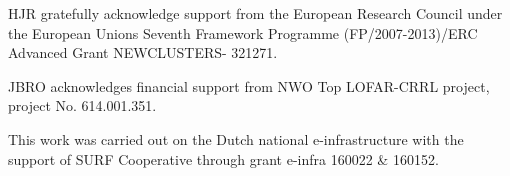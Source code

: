 HJR gratefully acknowledge support from the European Research Council under the European Unions Seventh Framework Programme (FP/2007-2013)/ERC Advanced Grant NEWCLUSTERS- 321271.

JBRO acknowledges financial support from NWO Top LOFAR-CRRL project, project No. 614.001.351. 


This work was carried out on the Dutch national e-infrastructure with the support of SURF
Cooperative through grant e-infra 160022 \& 160152.

%


